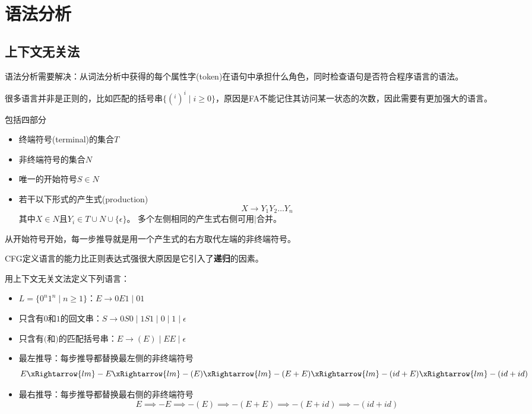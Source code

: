 
\section{语法分析}
\subsection{上下文无关法}
语法分析需要解决：从词法分析中获得的每个属性字(token)在语句中承担什么角色，同时检查语句是否符合程序语言的语法。

很多语言并非是正则的，比如匹配的括号串$\{(^i)^i\mid i\geq 0\}$，原因是FA不能记住其访问某一状态的次数，因此需要有更加强大的语言。

\begin{definition}
包括四部分
\begin{itemize}
	\item 终端符号(terminal)的集合$T$
	\item 非终端符号的集合$N$
	\item 唯一的开始符号$S\in N$
	\item 若干以下形式的产生式(production)
	\[X\to Y_1Y_2\ldots Y_n\]
	其中$X\in N$且$Y_i\in T\cup N\cup\{\epsilon\}$。
	多个左侧相同的产生式右侧可用$\mid$合并。
\end{itemize}
\end{definition}
\begin{definition}[推导(derivation)]
从开始符号开始，每一步推导就是用一个产生式的右方取代左端的非终端符号。
\end{definition}

CFG定义语言的能力比正则表达式强很大原因是它引入了\textbf{递归}的因素。

\begin{example}
用上下文无关文法定义下列语言：
\begin{itemize}
	\item $L=\{0^n1^n\mid n\geq 1\}$：$E\to 0E1\mid 01$
	\item 只含有$0$和$1$的回文串：$S\to 0S0\mid 1S1\mid 0\mid 1\mid \epsilon$
	\item 只含有$($和$)$的匹配括号串：$E\to (E)\mid EE\mid \epsilon$
\end{itemize}
\end{example}

\begin{itemize}
	\item 最左推导：每步推导都替换最左侧的非终端符号
	\[E\xRightarrow{lm}
	-E\xRightarrow{lm}
	-(E)\xRightarrow{lm}
	-(E+E)\xRightarrow{lm}
	-(id+E)\xRightarrow{lm}
	-(id+id)\]
	\item 最右推导：每步推导都替换最右侧的非终端符号
	\[E\implies
	-E\implies
	-(E)\implies
	-(E+E)\implies
	-(E+id)\implies
	-(id+id)\]
\end{itemize}

